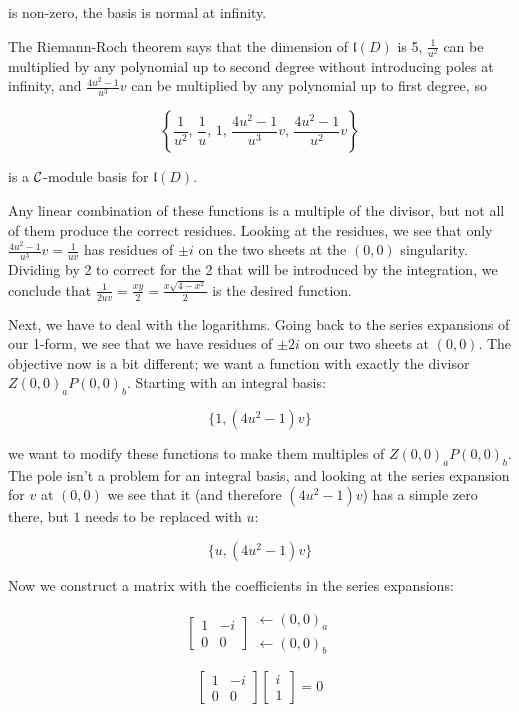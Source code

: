 is non-zero, the basis is normal at infinity.

The Riemann-Roch theorem says that the dimension of ${\mathfrak l}(D)$ is 5,
$\frac{1}{u^2}$ can be multiplied by any polynomial up to second
degree without introducing poles at infinity, and $\frac{4u^2-1}{u^3}v$
can be multiplied by any polynomial up to first degree, so

$$\left\{\frac{1}{u^2},\, \frac{1}{u},\, 1,\, \frac{4u^2-1}{u^3}v,\, \frac{4u^2-1}{u^2}v\right\}$$

is a ${\cal C}$-module basis for ${\mathfrak l}(D)$.

Any linear combination of these functions is a multiple of the
divisor, but not all of them produce the correct residues.  Looking at
the residues, we see that only $\frac{4u^2-1}{u^3}v = \frac{1}{uv}$
has residues of $\pm i$ on the two sheets at the $(0,0)$ singularity.
Dividing by 2 to correct for the 2 that will be introduced by the
integration, we conclude that $\frac{1}{2uv} = \frac{xy}{2} =
\frac{x\sqrt{4-x^2}}{2}$ is the desired function.

Next, we have to deal with the logarithms.  Going back to the
series expansions of our 1-form, we see that we have residues
of $\pm 2i$ on our two sheets at $(0,0)$.  The objective
now is a bit different; we want a function with exactly
the divisor $Z(0,0)_a P(0,0)_b$.  Starting with an integral basis:

$$\{1, (4u^2-1)v\}$$

we want to modify these functions to make them multiples
of $Z(0,0)_a P(0,0)_b$.  The pole isn't a problem for
an integral basis, and looking at the series expansion
for $v$ at $(0,0)$ we see that it (and therefore $(4u^2-1)v$)
has a simple zero there, but $1$ needs to be replaced with $u$:

$$\{u, (4u^2-1)v\}$$

Now we construct a matrix with the coefficients in the series expansions:

$$\left[ \begin{array}{cc} 1 & -i \\ 0 & 0 \end{array} \right] \begin{array}{ll} \leftarrow (0,0)_a \\ \leftarrow (0,0)_b \end{array} $$

$$\left[ \begin{array}{cc} 1 & -i \\ 0 & 0 \end{array} \right] \left[ \begin{array}{c} i \\ 1 \end{array} \right] = 0$$


